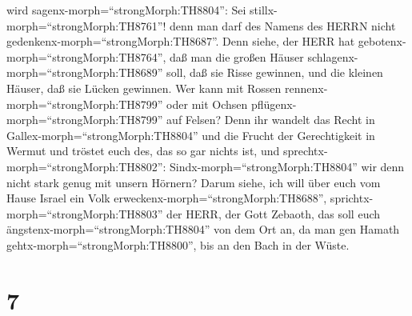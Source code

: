 wird sagenx-morph=``strongMorph:TH8804'': Sei
stillx-morph=``strongMorph:TH8761''! denn man darf des Namens des HERRN
nicht gedenkenx-morph=``strongMorph:TH8687''.  Denn siehe,
der HERR hat gebotenx-morph=``strongMorph:TH8764'', daß man die großen
Häuser schlagenx-morph=``strongMorph:TH8689'' soll, daß sie Risse
gewinnen, und die kleinen Häuser, daß sie Lücken gewinnen. 
Wer kann mit Rossen rennenx-morph=``strongMorph:TH8799'' oder mit Ochsen
pflügenx-morph=``strongMorph:TH8799'' auf Felsen? Denn ihr wandelt das
Recht in Gallex-morph=``strongMorph:TH8804'' und die Frucht der
Gerechtigkeit in Wermut  und tröstet euch des, das so gar
nichts ist, und sprechtx-morph=``strongMorph:TH8802'':
Sindx-morph=``strongMorph:TH8804'' wir denn nicht stark genug mit unsern
Hörnern?  Darum siehe, ich will über euch vom Hause Israel
ein Volk erweckenx-morph=``strongMorph:TH8688'',
sprichtx-morph=``strongMorph:TH8803'' der HERR, der Gott Zebaoth, das
soll euch ängstenx-morph=``strongMorph:TH8804'' von dem Ort an, da man
gen Hamath gehtx-morph=``strongMorph:TH8800'', bis an den Bach in der
Wüste.

\hypertarget{section-6}{%
\section{7}\label{section-6}}


